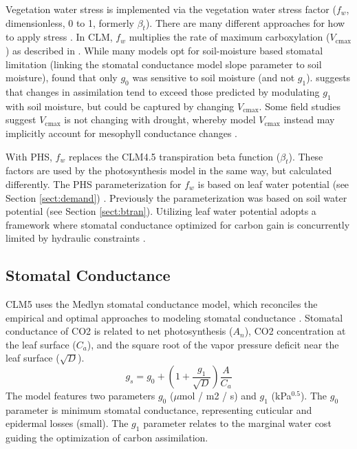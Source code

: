 \documentclass[draft,linenumbers]{agujournal}
\begin{document}
    Vegetation water stress is implemented via the vegetation water stress factor ($f_w$, dimensionless, 0 to 1, formerly $\beta_t$). 
    There are many different approaches for how to apply stress \citep{zhou2013,novick2016a,sperry2015}.
    In CLM, $f_w$ multiplies the rate of maximum carboxylation ($V_{\text{cmax}}$) as described in \citet{oleson2013}.
    While many models opt for soil-moisture based stomatal limitation (linking the stomatal conductance model slope parameter to soil moisture),
    \cite{lin2018} found that only $g_0$ was sensitive to soil moisture (and not $g_1$).
    \cite{zhou2013} suggests that changes in assimilation tend to exceed those predicted by modulating $g_1$ with soil moisture, but could be captured by changing $V_{\text{cmax}}$.
    Some field studies suggest $V_{\text{cmax}}$ is not changing with drought, whereby model $V_{\text{cmax}}$ instead may implicitly account for mesophyll conductance changes \citep{flexas2004}.
    
    With PHS, $f_w$ replaces the CLM4.5 transpiration beta function ($\beta_t$). 
    These factors are used by the photosynthesis model in the same way, but calculated differently. 
    The PHS parameterization for $f_w$ is based on leaf water potential (see Section \ref{sect:demand}) . 
    Previously the parameterization was based on soil water potential (see Section \ref{sect:btran}).
    Utilizing leaf water potential adopts a framework where stomatal conductance optimized for carbon gain is concurrently limited by hydraulic constraints \citep{novick2016a}.


\subsection{Stomatal Conductance}
\label{sect:gs}
    CLM5 uses the Medlyn stomatal conductance model, which reconciles the empirical and optimal approaches to modeling 
    stomatal conductance \citep{medlyn2011}. 
    Stomatal conductance of CO2 is related to net photosynthesis ($A_n$), CO2 concentration at the leaf surface 
    ($C_a$), and the square root of the vapor pressure deficit near the leaf surface ($\sqrt{D}$).
    \begin{equation}
    g_s=g_0+\left(1+\dfrac{g_1}{\sqrt{D}}\right)\dfrac{A}{C_a}
    \end{equation}
    The model features two parameters $g_0$ ($\mu$mol / m2 / s) and $g_1$ (kPa$^{0.5}$). 
    The $g_0$ parameter is minimum stomatal conductance, representing cuticular and epidermal losses (small). 
    The $g_1$ parameter relates to the marginal water cost guiding the optimization of carbon assimilation.
    
\end{document}
